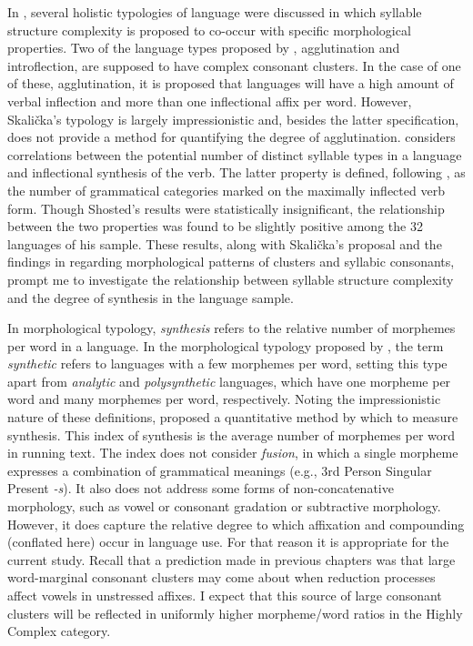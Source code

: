   In , several holistic typologies of language were discussed in which syllable structure complexity is proposed to co-occur with specific morphological properties. Two of the language types proposed by \citet{Skalička1979}, agglutination and introflection, are supposed to have complex consonant clusters. In the case of one of these, agglutination, it is proposed that languages will have a high amount of verbal inflection and more than one inflectional affix per word. However, Skalička’s typology is largely impressionistic and, besides the latter specification, does not provide a method for quantifying the degree of agglutination. \citet{Shosted2006} considers correlations between the potential number of distinct syllable types in a language and inflectional synthesis of the verb. The latter property is defined, following \citet{BickelNichols2005}, as the number of grammatical categories marked on the maximally inflected verb form. Though Shosted’s results were statistically insignificant, the relationship between the two properties was found to be slightly positive among the 32 languages of his sample. These results, along with Skalička’s proposal and the findings in  regarding morphological patterns of clusters and syllabic consonants, prompt me to investigate the relationship between syllable structure complexity and the degree of synthesis in the language sample.

  In morphological typology, \textit{synthesis} refers to the relative number of morphemes per word in a language. In the morphological typology proposed by \citet{Sapir1921}, the term \textit{synthetic} refers to languages with a few morphemes per word, setting this type apart from \textit{analytic} and \textit{polysynthetic} languages, which have one morpheme per word and many morphemes per word, respectively. Noting the impressionistic nature of these definitions, \citet{Greenberg1954} proposed a quantitative method by which to measure synthesis. This index of synthesis is the average number of morphemes per word in running text. The index does not consider \textit{fusion}, in which a single morpheme expresses a combination of grammatical meanings (e.g.,  3rd Person Singular Present \textit{-s}). It also does not address some forms of non-concatenative morphology, such as vowel or consonant gradation or subtractive morphology. However, it does capture the relative degree to which affixation and compounding (conflated here) occur in language use. For that reason it is appropriate for the current study. Recall that a prediction made in previous chapters was that large word-marginal consonant clusters may come about when reduction processes affect vowels in unstressed affixes. I expect that this source of large consonant clusters will be reflected in uniformly higher morpheme/word ratios in the Highly Complex category.

